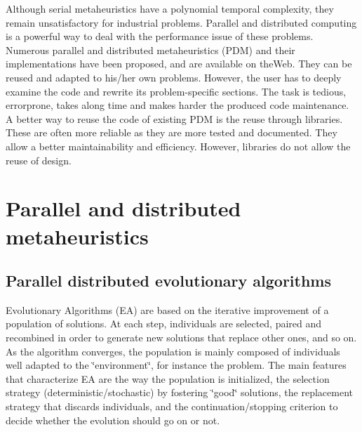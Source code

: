 Although serial metaheuristics have a polynomial temporal complexity, they remain unsatisfactory for industrial problems. Parallel and distributed computing is a powerful way to deal with the performance issue of these problems. Numerous parallel and distributed metaheuristics (PDM) and their implementations have been proposed, and are available on the\-Web. They can be reused and adapted to his/her own problems. However, the user has to deeply examine the code and rewrite its problem-specific sections. The task is tedious, errorprone, takes along time and makes harder the produced code maintenance. A better way to reuse the code of existing PDM is the reuse through libraries. These are often more reliable as they are more tested and documented. They allow a better maintainability and efficiency. However, libraries do not allow the reuse of design.\hypertarget{main_parallel_metaheuristics}{}\section{Parallel and distributed metaheuristics}\label{main_parallel_metaheuristics}
\hypertarget{main_parallel_distributed}{}\subsection{Parallel distributed evolutionary algorithms}\label{main_parallel_distributed}
Evolutionary Algorithms (EA) are based on the iterative improvement of a population of solutions. At each step, individuals are selected, paired and recombined in order to generate new solutions that replace other ones, and so on. As the algorithm converges, the population is mainly composed of individuals well adapted to the \char`\"{}environment\char`\"{}, for instance the problem. The main features that characterize EA are the way the population is initialized, the selection strategy (deterministic/stochastic) by fostering \char`\"{}good\char`\"{} solutions, the replacement strategy that discards individuals, and the continuation/stopping criterion to decide whether the evolution should go on or not.

